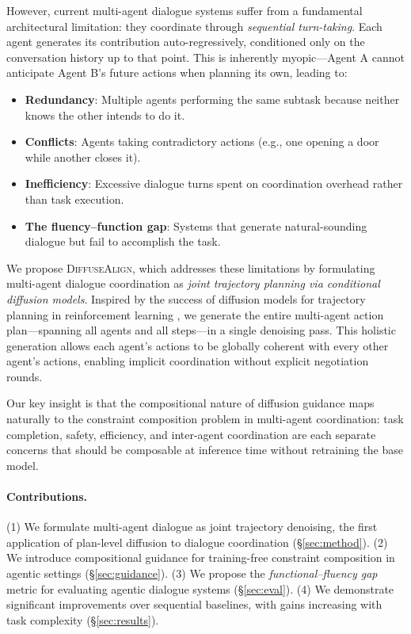 \documentclass[11pt]{article}
\newcommand{\method}{\textsc{DiffuseAlign}}
\begin{document}
However, current multi-agent dialogue systems suffer from a fundamental architectural limitation: they coordinate through \textit{sequential turn-taking}. Each agent generates its contribution auto-regressively, conditioned only on the conversation history up to that point. This is inherently myopic---Agent A cannot anticipate Agent B's future actions when planning its own, leading to:

\begin{itemize}
    \item \textbf{Redundancy}: Multiple agents performing the same subtask because neither knows the other intends to do it.
    \item \textbf{Conflicts}: Agents taking contradictory actions (e.g., one opening a door while another closes it).
    \item \textbf{Inefficiency}: Excessive dialogue turns spent on coordination overhead rather than task execution.
    \item \textbf{The fluency--function gap}: Systems that generate natural-sounding dialogue but fail to accomplish the task.
\end{itemize}

We propose \method{}, which addresses these limitations by formulating multi-agent dialogue coordination as \textit{joint trajectory planning via conditional diffusion models}. Inspired by the success of diffusion models for trajectory planning in reinforcement learning \citep{diffuser,decision_diffuser,mtdiff}, we generate the entire multi-agent action plan---spanning all agents and all steps---in a single denoising pass. This holistic generation allows each agent's actions to be globally coherent with every other agent's actions, enabling implicit coordination without explicit negotiation rounds.

Our key insight is that the compositional nature of diffusion guidance \citep{cfg,composable_diffusion} maps naturally to the constraint composition problem in multi-agent coordination: task completion, safety, efficiency, and inter-agent coordination are each separate concerns that should be composable at inference time without retraining the base model.

\paragraph{Contributions.} (1) We formulate multi-agent dialogue as joint trajectory denoising, the first application of plan-level diffusion to dialogue coordination (\S\ref{sec:method}). (2) We introduce compositional guidance for training-free constraint composition in agentic settings (\S\ref{sec:guidance}). (3) We propose the \textit{functional--fluency gap} metric for evaluating agentic dialogue systems (\S\ref{sec:eval}). (4) We demonstrate significant improvements over sequential baselines, with gains increasing with task complexity (\S\ref{sec:results}).
\end{document}
